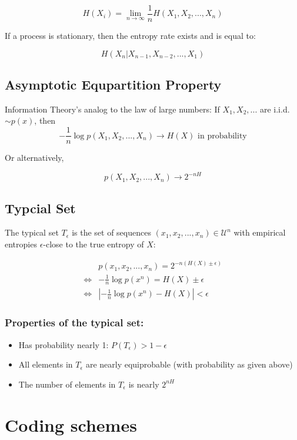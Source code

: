 \documentclass[10pt,a4paper,landscape]{article}
\newcommand{\alphabet}{\mathcal{U}}
\begin{document}
\begin{multicols*}{4}
$$H(X_i) = \lim_{n \rightarrow \infty} \frac{1}{n} H(X_1, X_2, ..., X_n)$$

If a process is stationary, then the entropy rate exists and is equal to:

$$H(X_n | X_{n-1}, X_{n-2}, ..., X_1)$$

\subsection{Asymptotic Equpartition Property}
Information Theory's analog to the law of large numbers: If $X_1, X_2, ...$ are i.i.d. $\sim p(x)$, then
$$ - \frac{1}{n} \log p(X_1, X_2, ..., X_n) \rightarrow H(X) \text{ in probability}$$

Or alternatively,

$$ p(X_1, X_2, ..., X_n) \rightarrow 2^{-n H}$$

\subsection{Typcial Set}
The typical set $T_\epsilon$ is the set of sequences $(x_1, x_2, ..., x_n) \in \alphabet^n$ with empirical entropies $\epsilon$-close to the true entropy of $X$:

\begin{align*}
	&p(x_1, x_2, ..., x_n) = 2^{-n(H(X) \pm \epsilon)}\\
	\Leftrightarrow & - \frac{1}{n} \log p(x^n) = H(X) \pm \epsilon\\
	\Leftrightarrow &\left | - \frac{1}{n} \log p(x^n) - H(X) \right | < \epsilon
\end{align*}

\subsubsection{Properties of the typical set:}
\begin{itemize}
	\item Has probability nearly 1: $P(T_\epsilon) > 1 - \epsilon$
	\item All elements in $T_\epsilon$ are nearly equiprobable (with probability as given above)
	\item The number of elements in $T_\epsilon$ is nearly $2^{nH}$
\end{itemize}

\section{Coding schemes}

\end{multicols*}
\end{document}
